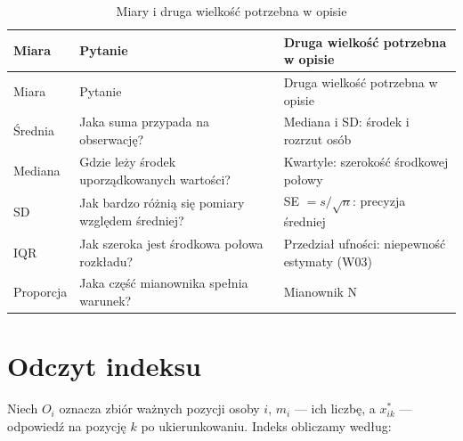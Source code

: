 \documentclass[
  polish,
  11pt,
  a4paper,
]{article}
\begin{document}
\begin{longtable}[]{@{}
  >{\raggedright\arraybackslash}p{}
  >{\raggedright\arraybackslash}p{}
  >{\raggedright\arraybackslash}p{}@{}}
\caption{Miary i druga wielkość potrzebna w opisie}\tabularnewline
\toprule\noalign{}
\begin{minipage}[b]{\linewidth}\raggedright
Miara
\end{minipage} & \begin{minipage}[b]{\linewidth}\raggedright
Pytanie
\end{minipage} & \begin{minipage}[b]{\linewidth}\raggedright
Druga wielkość potrzebna w opisie
\end{minipage} \\
\midrule\noalign{}
\endfirsthead
\toprule\noalign{}
\begin{minipage}[b]{\linewidth}\raggedright
Miara
\end{minipage} & \begin{minipage}[b]{\linewidth}\raggedright
Pytanie
\end{minipage} & \begin{minipage}[b]{\linewidth}\raggedright
Druga wielkość potrzebna w opisie
\end{minipage} \\
\midrule\noalign{}
\endhead
\bottomrule\noalign{}
\endlastfoot
Średnia & Jaka suma przypada na obserwację? & Mediana i SD: środek i
rozrzut osób \\
Mediana & Gdzie leży środek uporządkowanych wartości? & Kwartyle:
szerokość środkowej połowy \\
SD & Jak bardzo różnią się pomiary względem średniej? & SE
\(=s/\sqrt{n}\): precyzja średniej \\
IQR & Jak szeroka jest środkowa połowa rozkładu? & Przedział ufności:
niepewność estymaty (W03) \\
Proporcja & Jaka część mianownika spełnia warunek? & Mianownik N \\
\end{longtable}

\section{Odczyt indeksu}\label{odczyt-indeksu}

Niech \(O_i\) oznacza zbiór ważnych pozycji osoby \(i\), \(m_i\) --- ich
liczbę, a \(x^*_{ik}\) --- odpowiedź na pozycję \(k\) po ukierunkowaniu.
Indeks obliczamy według:
\end{document}
